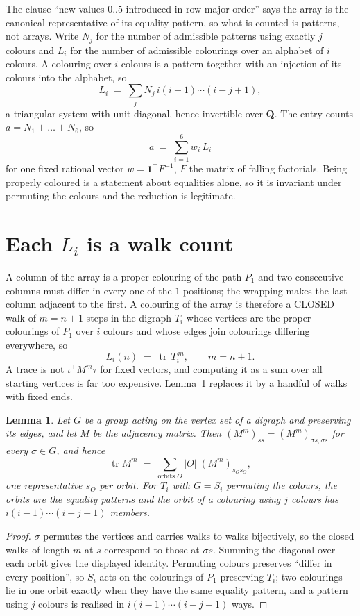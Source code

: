 \documentclass[11pt,a4paper]{article}
\theoremstyle{plain}
\newtheorem{lemma}[theorem]{Lemma}
\theoremstyle{definition}
\begin{document}
The clause ``new values $0..5$ introduced in row major order'' says the array is the
canonical representative of its equality pattern, so what is counted is patterns, not arrays.
Write $N_j$ for the number of admissible patterns using exactly $j$ colours and $L_i$ for the
number of admissible colourings over an alphabet of $i$ colours. A colouring over $i$ colours
is a pattern together with an injection of its colours into the alphabet, so
\[
L_i\;=\;\sum_j N_j\,i(i-1)\cdots(i-j+1),
\]
a triangular system with unit diagonal, hence invertible over $\mathbf{Q}$. The entry counts
$a=N_1+\dots+N_{6}$, so
\[
a\;=\;\sum_{i=1}^{6}w_i\,L_i
\]
for one fixed rational vector $w=\mathbf{1}^{\!\top}F^{-1}$, $F$ the matrix of falling
factorials. Being properly coloured is a statement about equalities alone, so it is invariant
under permuting the colours and the reduction is legitimate.

\section{Each $L_i$ is a walk count}

A column of the array is a proper colouring of the path $P_{1}$ and two consecutive
columns must differ in every one of the $1$ positions; the wrapping makes the last column
adjacent to the first. A colouring of the array is therefore a CLOSED walk of $m=n+1$ steps
in the digraph $T_i$ whose vertices are the proper colourings of $P_{1}$ over $i$ colours
and whose edges join colourings differing everywhere, so
\[
L_i(n)\;=\;\operatorname{tr}\,T_i^{\,m},\qquad m=n+1.
\]
A trace is not $\iota^{\!\top}M^m\tau$ for fixed vectors, and computing it as a sum over all
starting vertices is far too expensive. Lemma~\ref{lem:trace} replaces it by a handful of
walks with fixed ends.

\begin{lemma}\label{lem:trace}
Let $G$ be a group acting on the vertex set of a digraph and preserving its edges, and let $M$
be the adjacency matrix. Then $(M^m)_{ss}=(M^m)_{\sigma s,\sigma s}$ for every
$\sigma\in G$, and hence
\[
\operatorname{tr} M^m\;=\;\sum_{\text{orbits }O}|O|\;(M^m)_{s_O s_O} ,
\]
one representative $s_O$ per orbit. For $T_i$ with $G=S_i$ permuting the colours, the orbits
are the equality patterns and the orbit of a colouring using $j$ colours has
$i(i-1)\cdots(i-j+1)$ members.
\end{lemma}

\begin{proof}
$\sigma$ permutes the vertices and carries walks to walks bijectively, so the closed walks of
length $m$ at $s$ correspond to those at $\sigma s$. Summing the diagonal over each orbit
gives the displayed identity. Permuting colours preserves ``differ in every position'', so
$S_i$ acts on the colourings of $P_{1}$ preserving $T_i$; two colourings lie in one orbit
exactly when they have the same equality pattern, and a pattern using $j$ colours is realised
in $i(i-1)\cdots(i-j+1)$ ways.
\end{proof}
\end{document}
